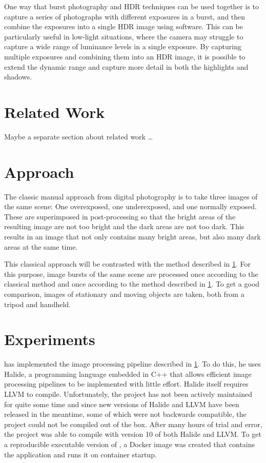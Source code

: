\documentclass{egpubl}
\begin{document}
One way that burst photography and HDR techniques can be used together
is to capture a series of photographs with different exposures in a burst, and then combine 
the exposures into a single HDR image using software. This can be particularly useful in 
low-light situations, where the camera may struggle to capture a wide range of luminance 
levels in a single exposure. By capturing multiple exposures and combining them into an 
HDR image, it is possible to extend the dynamic range and capture more detail in both the 
highlights and shadows.


\section{Related Work}
\label{sec:related_work}
Maybe a separate section about related work \ldots 
\blindtext


\section{Approach}
\label{sec:approach}

The classic manual approach from digital photography is to take three images of the same scene: 
One overexposed, one underexposed, and one normally exposed. These are superimposed in 
post-processing so that the bright areas of the resulting image are not too bright and the 
dark areas are not too dark. This results in an image that not only contains many bright areas, 
but also many dark areas at the same time.

This classical approach will be contrasted with the method described in \ref{sec:related_work}. 
For this purpose, image bursts of the same scene are processed once according to the 
classical method and once according to the method described in \ref{sec:related_work}. To get a good 
comparison, images of stationary and moving objects are taken, both from a tripod and 
handheld.


\section{Experiments}
\label{sec:Experiments}
\cite{Brooks2016git} has implemented the image processing pipeline described in \ref*{sec:related_work}. To do this, 
he uses Halide, a programming language embedded in C++ that allows efficient image processing 
pipelines to be implemented with little effort. Halide itself requires LLVM to compile. 
Unfortunately, the project has not been actively maintained for quite some time and 
since new versions of Halide and LLVM have been released in the meantime, some of which were 
not backwards compatible, the project could not be compiled out of the box. After many hours of 
trial and error, the project was able to compile with version 10 of both Halide and LLVM. 
To get a reproducible executable version of \cite{Brooks2016git}, a Docker image was created that 
contains the application and runs it on container startup.
\end{document}
